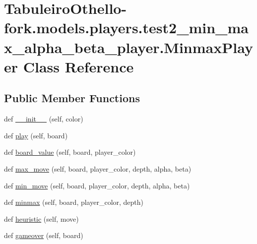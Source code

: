 \hypertarget{class_tabuleiro_othello-fork_1_1models_1_1players_1_1test2__min__max__alpha__beta__player_1_1_minmax_player}{}\section{Tabuleiro\+Othello-\/fork.models.\+players.\+test2\+\_\+min\+\_\+max\+\_\+alpha\+\_\+beta\+\_\+player.\+Minmax\+Player Class Reference}
\label{class_tabuleiro_othello-fork_1_1models_1_1players_1_1test2__min__max__alpha__beta__player_1_1_minmax_player}
\subsection*{Public Member Functions}
\begin{DoxyCompactItemize}
\item 
def \hyperlink{class_tabuleiro_othello-fork_1_1models_1_1players_1_1test2__min__max__alpha__beta__player_1_1_minmax_player_a4f9a313114ea35e4447012ba04939ed5}{\+\_\+\+\_\+init\+\_\+\+\_\+} (self, color)
\item 
def \hyperlink{class_tabuleiro_othello-fork_1_1models_1_1players_1_1test2__min__max__alpha__beta__player_1_1_minmax_player_a882464a04715cd5e3bacff22a42e97a1}{play} (self, board)
\item 
def \hyperlink{class_tabuleiro_othello-fork_1_1models_1_1players_1_1test2__min__max__alpha__beta__player_1_1_minmax_player_ab4d22ba66ca236f8887ed1199695bafd}{board\+\_\+value} (self, board, player\+\_\+color)
\item 
def \hyperlink{class_tabuleiro_othello-fork_1_1models_1_1players_1_1test2__min__max__alpha__beta__player_1_1_minmax_player_a779a1fe4503ffa367fd781ef767f675c}{max\+\_\+move} (self, board, player\+\_\+color, depth, alpha, beta)
\item 
def \hyperlink{class_tabuleiro_othello-fork_1_1models_1_1players_1_1test2__min__max__alpha__beta__player_1_1_minmax_player_a4beafe82d2d9aba90634b17e5b101bcc}{min\+\_\+move} (self, board, player\+\_\+color, depth, alpha, beta)
\item 
def \hyperlink{class_tabuleiro_othello-fork_1_1models_1_1players_1_1test2__min__max__alpha__beta__player_1_1_minmax_player_a063abf85499822adf799f725eb7adc0a}{minmax} (self, board, player\+\_\+color, depth)
\item 
def \hyperlink{class_tabuleiro_othello-fork_1_1models_1_1players_1_1test2__min__max__alpha__beta__player_1_1_minmax_player_a07a0578cf11a1d1b2727d44fef388b1a}{heuristic} (self, move)
\item 
def \hyperlink{class_tabuleiro_othello-fork_1_1models_1_1players_1_1test2__min__max__alpha__beta__player_1_1_minmax_player_ab2852c0ef15764b254dd6b6e665a54ad}{gameover} (self, board)
\end{DoxyCompactItemize}
